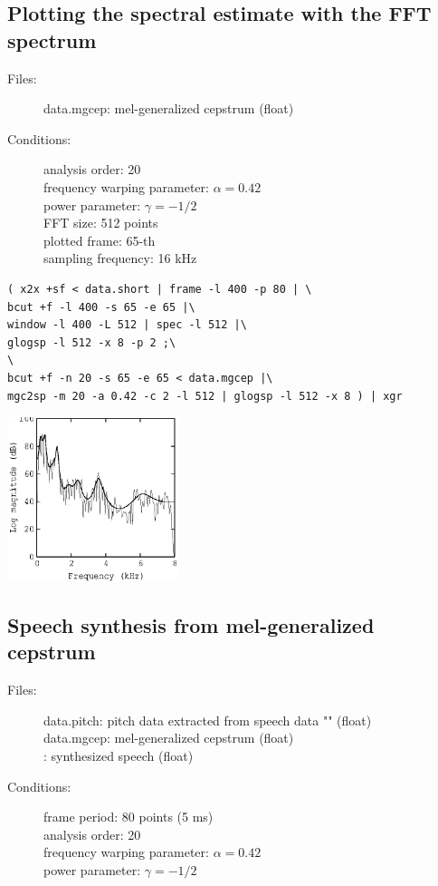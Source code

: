 \documentclass[a4paper,10pt]{article}
\begin{document}
\subsection{Plotting the spectral estimate with the FFT spectrum}

\begin{description}
\item[Files:]
  data.mgcep: mel-generalized cepstrum (float)
\item[Conditions:]
  analysis order: 20\\
  frequency warping parameter: $\alpha = 0.42$\\
  power parameter: $\gamma = -1/2$\\
  FFT size: 512 points\\
  plotted frame: 65-th\\
  sampling frequency: 16 kHz
\end{description}

\begin{verbatim}
( x2x +sf < data.short | frame -l 400 -p 80 | \
bcut +f -l 400 -s 65 -e 65 |\
window -l 400 -L 512 | spec -l 512 |\
glogsp -l 512 -x 8 -p 2 ;\
\
bcut +f -n 20 -s 65 -e 65 < data.mgcep |\
mgc2sp -m 20 -a 0.42 -c 2 -l 512 | glogsp -l 512 -x 8 ) | xgr
\end{verbatim}

\includegraphics[width=5cm]{eps/data.mgcep.glogsp.eps}

\subsection{Speech synthesis from mel-generalized cepstrum}

\begin{description}
\item[Files:]
  data.pitch: pitch data extracted from speech data
           ""
           (float)\\
  data.mgcep: mel-generalized cepstrum (float)\\
    :
  synthesized speech (float)
\item[Conditions:]
  frame period: 80 points (5 ms)\\
  analysis order: 20\\
  frequency warping parameter: $\alpha = 0.42$\\
  power parameter: $\gamma = -1/2$
\end{description}
\end{document}
